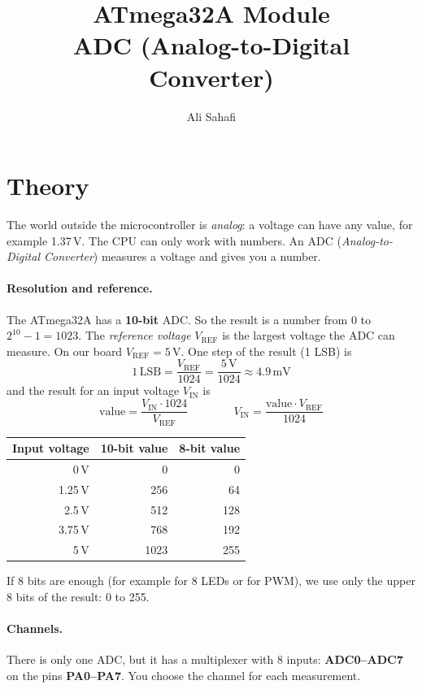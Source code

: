 \documentclass[11pt,a4paper]{article}
\title{ATmega32A Module \\ \Large ADC (Analog-to-Digital Converter)}
\author{Ali Sahafi}
\date{}
\begin{document}
\maketitle

\section{Theory}

The world outside the microcontroller is \emph{analog}: a voltage can have any
value, for example 1.37\,V. The CPU can only work with numbers. An ADC
(\emph{Analog-to-Digital Converter}) measures a voltage and gives you a number.

\paragraph{Resolution and reference.} The ATmega32A has a \textbf{10-bit} ADC.
So the result is a number from 0 to $2^{10}-1 = 1023$. The \emph{reference
voltage} $V_{\text{REF}}$ is the largest voltage the ADC can measure. On our
board $V_{\text{REF}} = 5$\,V. One step of the result (1 LSB) is
\[ 1\,\text{LSB} = \frac{V_{\text{REF}}}{1024} = \frac{5\,\text{V}}{1024} \approx 4.9\,\text{mV} \]
and the result for an input voltage $V_{\text{IN}}$ is
\[ \text{value} = \frac{V_{\text{IN}} \cdot 1024}{V_{\text{REF}}}
   \qquad\qquad V_{\text{IN}} = \frac{\text{value} \cdot V_{\text{REF}}}{1024} \]

\begin{center}
\begin{tabular}{rrr}
\toprule
\textbf{Input voltage} & \textbf{10-bit value} & \textbf{8-bit value} \\
\midrule
0\,V    & 0    & 0   \\
1.25\,V & 256  & 64  \\
2.5\,V  & 512  & 128 \\
3.75\,V & 768  & 192 \\
5\,V    & 1023 & 255 \\
\bottomrule
\end{tabular}
\end{center}

If 8 bits are enough (for example for 8 LEDs or for PWM), we use only the
upper 8 bits of the result: 0 to 255.

\paragraph{Channels.} There is only one ADC, but it has a multiplexer with 8
inputs: \textbf{ADC0--ADC7} on the pins \textbf{PA0--PA7}. You choose the
channel for each measurement.
\end{document}

